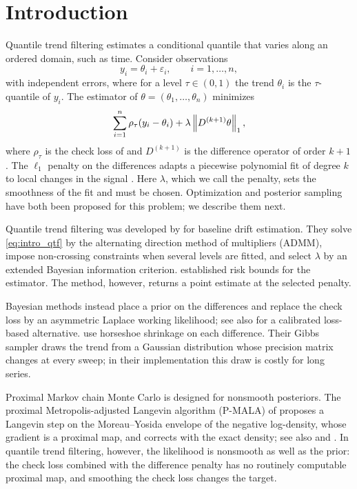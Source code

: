 \section{Introduction}
\label{sec:introduction}

Quantile trend filtering estimates a conditional quantile that varies along an ordered domain, such as time. Consider observations
\begin{equation}
    y_i = \theta_i + \varepsilon_i, \qquad i = 1, \ldots, n,
    \label{eq:intro_model}
\end{equation}
with independent errors, where for a level $\tau \in (0,1)$ the trend $\theta_i$ is the $\tau$-quantile of $y_i$. The estimator of $\theta = (\theta_1, \ldots, \theta_n)$ minimizes
\begin{equation}
    \sum_{i=1}^n \rho_\tau(y_i - \theta_i) + \lambda \left\lVert D^{(k+1)}\theta\right\rVert_1,
    \label{eq:intro_qtf}
\end{equation}
where $\rho_\tau$ is the check loss of \citet{koenker1978regression} and $D^{(k+1)}$ is the difference operator of order $k+1$. The $\ell_1$ penalty on the differences adapts a piecewise polynomial fit of degree $k$ to local changes in the signal \citep{tibshirani2014adaptive,madrid2022risk}. Here $\lambda$, which we call the penalty, sets the smoothness of the fit and must be chosen. Optimization and posterior sampling have both been proposed for this problem; we describe them next.

Quantile trend filtering was developed by \citet{brantley2020baseline} for baseline drift estimation. They solve \eqref{eq:intro_qtf} by the alternating direction method of multipliers (ADMM), impose non-crossing constraints when several levels are fitted, and select $\lambda$ by an extended Bayesian information criterion. \citet{madrid2022risk} established risk bounds for the estimator. The method, however, returns a point estimate at the selected penalty.

Bayesian methods instead place a prior on the differences and replace the check loss by an asymmetric Laplace working likelihood; see also \citet{fasiolo2021fast} for a calibrated loss-based alternative. \citet{onizuka2024fast} use horseshoe shrinkage on each difference. Their Gibbs sampler draws the trend from a Gaussian distribution whose precision matrix changes at every sweep; in their implementation this draw is costly for long series.

Proximal Markov chain Monte Carlo is designed for nonsmooth posteriors. The proximal Metropolis-adjusted Langevin algorithm (P-MALA) of \citet{pereyra2016proximal} proposes a Langevin step on the Moreau--Yosida envelope of the negative log-density, whose gradient is a proximal map, and corrects with the exact density; see also \citet{durmus2018efficient} and \citet{heng2023bayesian}. In quantile trend filtering, however, the likelihood is nonsmooth as well as the prior: the check loss combined with the difference penalty has no routinely computable proximal map, and smoothing the check loss changes the target.

